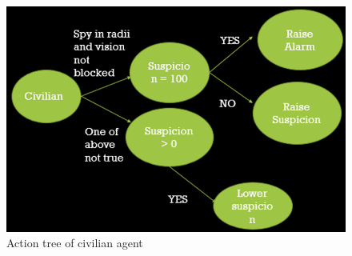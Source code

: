 \documentclass[12pt]{article}
\begin{document}
\begin{figure}[p!]
\includegraphics[scale=1]{Picture6.png}
\centering
\caption{Action tree of civilian agent}
\end{figure}
\newpage
\end{document}
